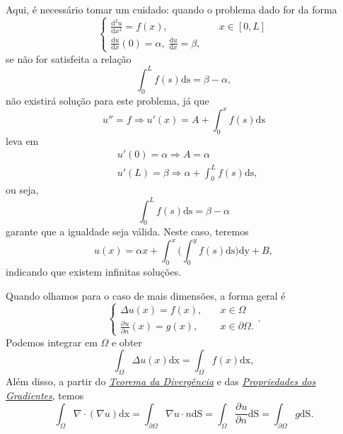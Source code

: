 \documentclass[../pde_notes.tex]{subfiles}
\begin{document}
\begin{example}
	Aqui, é necessário tomar um cuidado: quando o problema dado for da forma
	\[
		\left\{\begin{array}{ll}
			\frac{\mathrm{d}^{2}u}{\mathrm{d}x^{2}} = f(x), & \quad x\in [0, L] \\
			\frac{\mathrm{d}u}{\mathrm{d}x}(0) = \alpha , \; \frac{\mathrm{d}u}{\mathrm{d}x} = \beta ,
		\end{array}\right.
	\]
	se não for satisfeita a relação
	\[
		\int_{0}^{L}f(s) \mathrm{ds}=\beta - \alpha ,
	\]
	não existirá solução para este problema, já que
	\[
		u'' = f \Rightarrow u'(x) = A + \int_{0}^{x}f(s) \mathrm{ds}
	\]
	leva em
	\begin{align*}
		 & u'(0) = \alpha \Rightarrow A = \alpha                             \\
		 & u'(L) = \beta \Rightarrow \alpha  + \int_{0}^{L}f(s) \mathrm{ds},
	\end{align*}
	ou seja,
	\[
		\int_{0}^{L}f(s) \mathrm{ds} = \beta - \alpha
	\]
	garante que a igualdade seja válida. Neste caso, teremos
	\[
		u(x) = \alpha x + \int_{0}^{x}\biggl(\int_{0}^{y}f(s) \mathrm{ds}\biggr) \mathrm{dy} + B,
	\]
	indicando que existem infinitas soluções.
\end{example}

Quando olhamos para o caso de mais dimensões, a forma geral é
\[
	\left\{\begin{array}{ll}
		\Delta u(x) = f(x),                           & \quad x\in \Omega            \\
		\frac{\partial^{}u}{\partial n^{}}(x) = g(x), & \quad x\in \partial \Omega .
	\end{array}\right..
\]
Podemos integrar em \(\Omega \) e obter
\[
	\int_{\Omega }^{}\Delta u(x) \mathrm{dx} = \int_{\Omega }^{}f(x) \mathrm{dx},
\]
Além disso, a partir do \hyperlink{divergence_theorem}{\textit{Teorema da Divergência}} e das \hyperlink{gradient_properties}{\textit{Propriedades dos Gradientes}}, temos
\[
	\int_{\Omega }^{}\nabla \cdot (\nabla u) \mathrm{dx} = \int_{\partial \Omega }^{}\nabla u \cdot n \mathrm{dS} = \int_{\Omega }^{}\frac{\partial^{}u}{\partial n^{}} \mathrm{dS} = \int_{\partial \Omega }^{}g \mathrm{dS}.
\]
\end{document}
